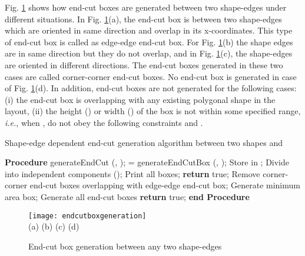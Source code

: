 \documentclass[12pt]{spieman}
\theoremstyle{plain}
\begin{document}
\begin{spacing}{1}
Fig. \ref{fig:endcutboxgeneration} shows how end-cut boxes are generated between two shape-edges under different situations. In Fig. \ref{fig:endcutboxgeneration}(a), the end-cut box is between two shape-edges which are oriented in same direction and overlap in its x-coordinates. This type of end-cut box is called as edge-edge end-cut box. For Fig. \ref{fig:endcutboxgeneration}(b) the shape edges are in same direction but they do not overlap, and in Fig. \ref{fig:endcutboxgeneration}(c), the shape-edges are oriented in different directions. The end-cut boxes generated in these two cases are called corner-corner end-cut boxes. No end-cut box is generated in case of Fig. \ref{fig:endcutboxgeneration}(d). In addition, end-cut boxes are not generated for the following cases: (i) the end-cut box is overlapping with any existing polygonal shape in the layout, (ii) the height () or width () of the box is not within some specified range, \textit{i.e.}, when ,  do not obey the following constraints  and .

\begin{algorithm}[htb]
\caption{Shape-edge dependent end-cut generation algorithm between two shapes  and }\label{alg:endcutgeneration}
\begin{algorithmic}[1]
\State \textbf{Procedure} generateEndCut (, );
                \State  = generateEndCutBox (, );
                        \State Store  in ;
                \EndIf
        \EndFor
\EndFor
\State Divide  into independent components ();
\If{}
        \State Print all boxes;
        \State \textbf{return} true;
\EndIf
\ForAll{}
        \State Remove corner-corner end-cut boxes overlapping with edge-edge end-cut box;
                \State Generate minimum area box;
        \Else
                \State Generate all end-cut boxes
        \EndIf
\EndFor
\State \textbf{return} true;
\State \textbf{end Procedure}
\end{algorithmic}
\end{algorithm}

\begin{figure}[htb]
  \centering
  \texttt{[image: endcutboxgeneration]}
  \\ \hspace{1.4cm} (a) \hspace{3.4cm} (b) \hspace{3.4cm} (c) \hspace{3.4cm} (d)
  \caption{End-cut box generation between any two shape-edges}
  \label{fig:endcutboxgeneration}
\end{figure}


\end{spacing}
\end{document}
